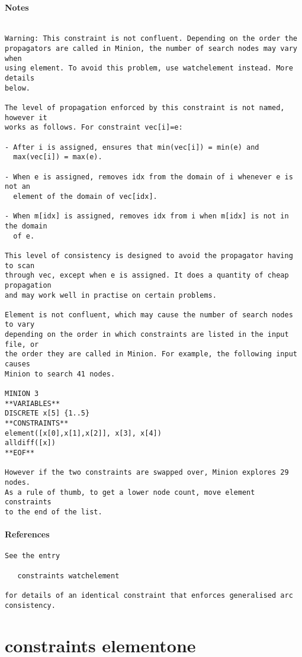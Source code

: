 \paragraph{Notes}
{\footnotesize
\begin{verbatim}

Warning: This constraint is not confluent. Depending on the order the
propagators are called in Minion, the number of search nodes may vary when
using element. To avoid this problem, use watchelement instead. More details
below.

The level of propagation enforced by this constraint is not named, however it
works as follows. For constraint vec[i]=e:

- After i is assigned, ensures that min(vec[i]) = min(e) and 
  max(vec[i]) = max(e).

- When e is assigned, removes idx from the domain of i whenever e is not an
  element of the domain of vec[idx].

- When m[idx] is assigned, removes idx from i when m[idx] is not in the domain
  of e.

This level of consistency is designed to avoid the propagator having to scan
through vec, except when e is assigned. It does a quantity of cheap propagation
and may work well in practise on certain problems.

Element is not confluent, which may cause the number of search nodes to vary
depending on the order in which constraints are listed in the input file, or 
the order they are called in Minion. For example, the following input causes
Minion to search 41 nodes.

MINION 3
**VARIABLES**
DISCRETE x[5] {1..5}
**CONSTRAINTS**
element([x[0],x[1],x[2]], x[3], x[4])
alldiff([x])
**EOF**

However if the two constraints are swapped over, Minion explores 29 nodes.
As a rule of thumb, to get a lower node count, move element constraints
to the end of the list.
\end{verbatim}
}
\paragraph{References}
{\footnotesize
\begin{verbatim}
See the entry 

   constraints watchelement

for details of an identical constraint that enforces generalised arc
consistency.
\end{verbatim}
}
\section{constraints element\textunderscore one}
